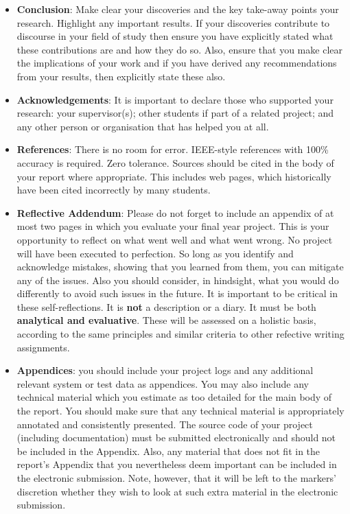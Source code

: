 \begin{itemize}
\item \textbf{Conclusion}: Make clear your discoveries and the key take-away points your research. Highlight any important results. If your discoveries contribute to discourse in your field of study then ensure you have explicitly stated what these contributions are and how they do so. Also, ensure that you make clear the implications of your work and if you have derived any recommendations from your results, then explicitly state these also. 

\item \textbf{Acknowledgements}: It is important to declare those who supported your research: your supervisor(s); other students if part of a related project; and any other person or organisation that has helped you at all.

\item \textbf{References}: There is no room for error. IEEE-style references with 100\% accuracy is required. Zero tolerance. Sources should be cited in the body of your report where appropriate. This includes web pages, which historically have been cited incorrectly by many students.

\item \textbf{Reflective Addendum}: Please do not forget to include an appendix of at most two pages in which you evaluate your final year project. This is your opportunity to reflect on what went well and what went wrong. No project will have been executed to perfection. So long as you identify and acknowledge mistakes, showing that you learned from them, you can mitigate any of the issues. Also you should consider, in hindsight, what you would do differently to avoid such issues in the future. It is important to be critical in these self-reflections. It is \textbf{not} a description or a diary. It must be both \textbf{analytical and evaluative}. These will be assessed on a holistic basis, according to the same principles and similar criteria to other refective writing assignments. 

\item \textbf{Appendices}: you should include your project logs and any additional relevant system or test data as appendices. You may also include any technical material which you estimate as too detailed for the main body of the report. You should make sure that any technical material is appropriately annotated and consistently presented. The source code of your project (including documentation) must be submitted electronically and should not be included in the Appendix. Also, any material that does not fit in the report's Appendix that you nevertheless deem important can be included in the electronic submission. Note, however, that it will be left to the markers' discretion whether they wish to look at such extra material in the electronic submission.

\end{itemize}

